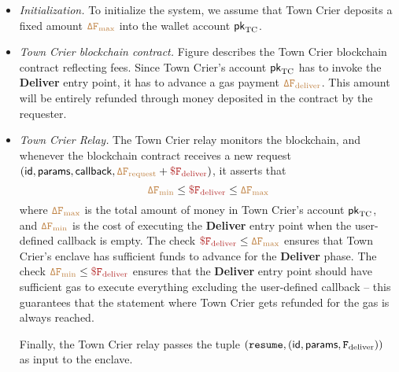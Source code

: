 \begin{itemize}[leftmargin=5mm]
\item
{\it Initialization.}
To initialize the system, we assume that Town Crier 
deposits a fixed amount $\tt {\color{brown} \Delta F_{\text{max}} }$ 
into the wallet account ${\sf pk}_{\textrm{TC}}$.
\item
{\it Town Crier blockchain contract.}
Figure  describes the  
Town Crier blockchain contract reflecting fees.
Since Town Crier's account 
${\sf pk}_{\textrm{TC}}$ has to invoke the {\bf Deliver} entry point, it has
to advance 
a gas payment 
$\tt {\color{brown} \Delta F_{\text{deliver}} }$.
This amount will be entirely refunded through money deposited in the contract 
by the requester.
\item
{\it Town Crier Relay.}
The Town Crier relay monitors
the blockchain, and whenever
the blockchain contract \tcont
receives a new request $({\sf id}, {\sf params}, {\sf callback}, 
\sbrown{\Delta F_{\text{request}}}+\smaroon{\$ F_{\text{deliver}}})$,
it asserts that 
\[
\sbrown{\Delta F_{\text{min}}}
\leq \smaroon{\$ F_{\text{deliver}}} \leq \sbrown{\Delta F_{\text{max}}}
\]
where $\tt {\color{brown} \Delta F_{\text{max}} }$ is the total amount of money
in Town Crier's account ${\sf pk}_{\textrm{TC}}$, 
and $\tt {\color{brown} \Delta F_{\text{min}} }$
is the cost of executing the {\bf Deliver} entry point 
when the user-defined callback is empty.
The check 
$\smaroon{\$ F_{\text{deliver}}} \leq \sbrown{\Delta F_{\text{max}}}$
ensures that Town Crier's enclave  
has sufficient funds to advance
for the {\bf Deliver} phase.
The check 
$\sbrown{\Delta F_{\text{min}}}
\leq \smaroon{\$ F_{\text{deliver}}}$
ensures that 
the {\bf Deliver} entry point should 
have sufficient gas to execute everything excluding the user-defined
callback -- this guarantees that the statement
where Town Crier gets refunded for the gas is always reached.


Finally, the Town Crier relay passes
the tuple $({\tt resume}, 
({\sf id}, {\sf params}, 
{\tt F_{\text{deliver}}}
))$
as input to the enclave.



\end{itemize}
